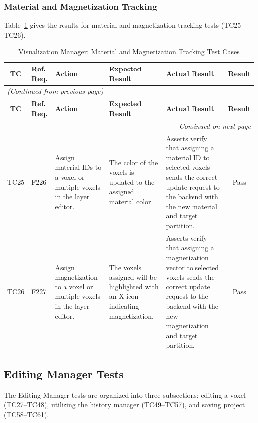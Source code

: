 \documentclass[12pt, titlepage]{article}
\begin{document}
\subsubsection{Material and Magnetization Tracking}
Table~\ref{table:vm_tracking_tests} gives the results for material and magnetization tracking tests (TC25--TC26).

\begin{longtable}{c
    >{\raggedright\arraybackslash}p{1.5cm}
    >{\raggedright\arraybackslash}p{3cm}
    >{\raggedright\arraybackslash}p{3cm}
  >{\raggedright\arraybackslash}p{5cm} c}
  \caption{Visualization Manager: Material and Magnetization Tracking Test Cases}
  \label{table:vm_tracking_tests} \\
  \toprule
  \textbf{TC} & \textbf{Ref. Req.} & \textbf{Action} &
  \textbf{Expected Result} & \textbf{Actual Result} & \textbf{Result} \\
  \midrule
  \endfirsthead

  \multicolumn{6}{l}{\textit{(Continued from previous page)}} \\
  \toprule
  \textbf{TC} & \textbf{Ref. Req.} & \textbf{Action} &
  \textbf{Expected Result} & \textbf{Actual Result} & \textbf{Result} \\
  \midrule
  \endhead

  \multicolumn{6}{r}{\textit{Continued on next page}} \\
  \endfoot

  \bottomrule
  \endlastfoot

  TC25 & F226 & Assign material IDs to a voxel or multiple voxels in the layer editor. & The color of the voxels is updated to the assigned material color. & Asserts verify that assigning a material ID to selected voxels sends the correct update request to the backend with the new material and target partition. & \cellcolor{green} Pass \\ \midrule
  TC26 & F227 & Assign magnetization to a voxel or multiple voxels in the layer editor. & The voxels assigned will be highlighted with an X icon indicating magnetization. & Asserts verify that assigning a magnetization vector to selected voxels sends the correct update request to the backend with the new magnetization and target partition. & \cellcolor{green} Pass \\

\end{longtable}

\subsection{Editing Manager Tests}
The Editing Manager tests are organized into three subsections: editing a voxel (TC27--TC48), utilizing the history manager (TC49--TC57), and saving project (TC58--TC61).
\end{document}
